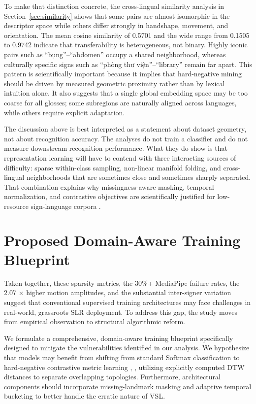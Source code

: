 \documentclass{ieeeaccess}
\begin{document}
To make that distinction concrete, the cross-lingual similarity analysis in Section~\ref{sec:similarity} shows that some pairs are almost isomorphic in the descriptor space while others differ strongly in handshape, movement, and orientation. The mean cosine similarity of 0.5701 and the wide range from 0.1505 to 0.9742 indicate that transferability is heterogeneous, not binary. Highly iconic pairs such as ``bụng''--``abdomen'' occupy a shared neighborhood, whereas culturally specific signs such as ``phòng thư viện''--``library'' remain far apart. This pattern is scientifically important because it implies that hard-negative mining should be driven by measured geometric proximity rather than by lexical intuition alone. It also suggests that a single global embedding space may be too coarse for all glosses; some subregions are naturally aligned across languages, while others require explicit adaptation.

The discussion above is best interpreted as a statement about dataset geometry, not about recognition accuracy. The analyses do not train a classifier and do not measure downstream recognition performance. What they do show is that representation learning will have to contend with three interacting sources of difficulty: sparse within-class sampling, non-linear manifold folding, and cross-lingual neighborhoods that are sometimes close and sometimes sharply separated. That combination explains why missingness-aware masking, temporal normalization, and contrastive objectives are scientifically justified for low-resource sign-language corpora \cite{buda2018systematic, chen2020simple, robinson2020contrastive, sakoe1978dynamic}.

\FloatBarrier

\FloatBarrier
\section{Proposed Domain-Aware Training Blueprint} \label{sec:actionplan}

Taken together, these sparsity metrics, the 30\%+ MediaPipe failure rates, the 2.07 $\times$ higher motion amplitudes, and the substantial inter-signer variation suggest that conventional supervised training architectures may face challenges in real-world, grassroots SLR deployment. To address this gap, the study moves from empirical observation to structural algorithmic reform. 

We formulate a comprehensive, domain-aware training blueprint specifically designed to mitigate the vulnerabilities identified in our analysis. We hypothesize that models may benefit from shifting from standard Softmax classification to hard-negative contrastive metric learning \cite{chen2020simple}, \cite{robinson2020contrastive}, utilizing explicitly computed DTW distances to separate overlapping topologies. Furthermore, architectural components should incorporate missing-landmark masking and adaptive temporal bucketing to better handle the erratic nature of VSL.
\end{document}
